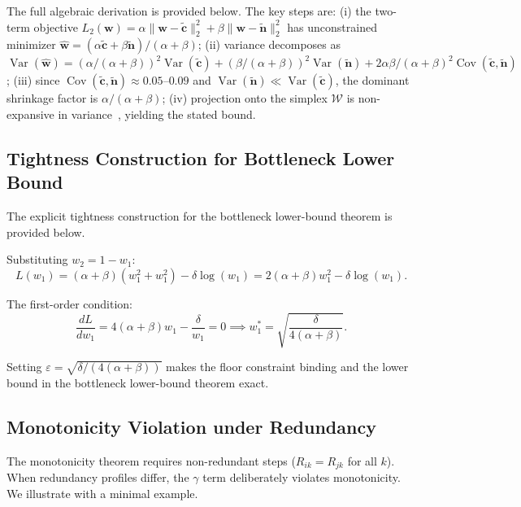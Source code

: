 \documentclass[pdflatex,sn-mathphys-num]{sn-jnl}
\begin{document}
The full algebraic derivation is provided below. The key steps are: (i) the two-term objective $L_2(\mathbf{w}) = \alpha\|\mathbf{w} - \tilde{\mathbf{c}}\|_2^2 + \beta\|\mathbf{w} - \tilde{\mathbf{n}}\|_2^2$ has unconstrained minimizer $\hat{\mathbf{w}} = (\alpha\tilde{\mathbf{c}} + \beta\tilde{\mathbf{n}})/(\alpha+\beta)$; (ii) variance decomposes as $\operatorname{Var}(\hat{\mathbf{w}}) = (\alpha/(\alpha+\beta))^2\operatorname{Var}(\tilde{\mathbf{c}}) + (\beta/(\alpha+\beta))^2\operatorname{Var}(\tilde{\mathbf{n}}) + 2\alpha\beta/(\alpha+\beta)^2\operatorname{Cov}(\tilde{\mathbf{c}}, \tilde{\mathbf{n}})$; (iii) since $\operatorname{Cov}(\tilde{\mathbf{c}}, \tilde{\mathbf{n}}) \approx 0.05$--$0.09$ and $\operatorname{Var}(\tilde{\mathbf{n}}) \ll \operatorname{Var}(\tilde{\mathbf{c}})$, the dominant shrinkage factor is $\alpha/(\alpha+\beta)$; (iv) projection onto the simplex $\mathcal{W}$ is non-expansive in variance~\cite{wang2013projection}, yielding the stated bound.

\subsection{Tightness Construction for Bottleneck Lower Bound}
\label{app:bottleneck-tightness}

The explicit tightness construction for the bottleneck lower-bound theorem is provided below.

Substituting $w_2 = 1 - w_1$:
\begin{equation}
L(w_1) = (\alpha+\beta)(w_1^2 + w_1^2) - \delta\log(w_1) = 2(\alpha+\beta)w_1^2 - \delta\log(w_1).
\end{equation}

The first-order condition:
\begin{equation}
\frac{dL}{dw_1} = 4(\alpha+\beta)w_1 - \frac{\delta}{w_1} = 0 \implies w_1^* = \sqrt{\frac{\delta}{4(\alpha+\beta)}}.
\end{equation}

Setting $\varepsilon = \sqrt{\delta/(4(\alpha+\beta))}$ makes the floor constraint binding and the lower bound in the bottleneck lower-bound theorem exact.

\subsection{Monotonicity Violation under Redundancy}
\label{app:monotonicity-redundancy}

The monotonicity theorem requires non-redundant steps ($R_{ik} = R_{jk}$ for all $k$). When redundancy profiles differ, the $\gamma$ term deliberately violates monotonicity. We illustrate with a minimal example.
\end{document}
